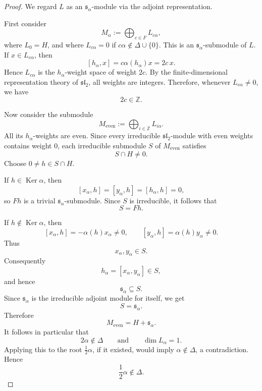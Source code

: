 \begin{proof}
    We regard \(L\) as an \(\mathfrak{s}_\alpha\)-module via the adjoint
    representation.

    First consider
    \[
        M_\alpha
        :=
        \bigoplus_{c\in F} L_{c\alpha},
    \]
    where \(L_0=H\), and where \(L_{c\alpha}=0\) if \(c\alpha\notin\Delta\cup\{0\}\).
    This is an \(\mathfrak{s}_\alpha\)-submodule of \(L\). If
    \(x\in L_{c\alpha}\), then
    \[
        [h_\alpha,x]
        =
        c\alpha(h_\alpha)x
        =
        2c\,x.
    \]
    Hence \(L_{c\alpha}\) is the \(h_\alpha\)-weight space of weight \(2c\).
    By the finite-dimensional representation theory of \(\mathfrak{sl}_2\), all
    weights are integers. Therefore, whenever \(L_{c\alpha}\neq 0\), we have
    \[
        2c\in\mathbb{Z}.
    \]

    Now consider the submodule
    \[
        M_{\mathrm{even}}
        :=
        \bigoplus_{i\in\mathbb{Z}} L_{i\alpha}.
    \]
    All its \(h_\alpha\)-weights are even. Since every irreducible
    \(\mathfrak{sl}_2\)-module with even weights contains weight \(0\), each
    irreducible submodule \(S\) of \(M_{\mathrm{even}}\) satisfies
    \[
        S\cap H\neq 0.
    \]
    Choose \(0\neq h\in S\cap H\).

    If \(h\in\operatorname{Ker}\alpha\), then
    \[
        [x_\alpha,h]=[y_\alpha,h]=[h_\alpha,h]=0,
    \]
    so \(Fh\) is a trivial \(\mathfrak{s}_\alpha\)-submodule. Since \(S\) is
    irreducible, it follows that
    \[
        S=Fh.
    \]

    If \(h\notin\operatorname{Ker}\alpha\), then
    \[
        [x_\alpha,h]
        =
        -\alpha(h)x_\alpha\neq 0,
        \qquad
        [y_\alpha,h]
        =
        \alpha(h)y_\alpha\neq 0.
    \]
    Thus
    \[
        x_\alpha,y_\alpha\in S.
    \]
    Consequently
    \[
        h_\alpha=[x_\alpha,y_\alpha]\in S,
    \]
    and hence
    \[
        \mathfrak{s}_\alpha\subseteq S.
    \]
    Since \(\mathfrak{s}_\alpha\) is the irreducible adjoint module for itself,
    we get
    \[
        S=\mathfrak{s}_\alpha.
    \]
    Therefore
    \[
        M_{\mathrm{even}}
        =
        H+\mathfrak{s}_\alpha.
    \]
    It follows in particular that
    \[
        2\alpha\notin\Delta
        \qquad\text{and}\qquad
        \dim L_\alpha=1.
    \]
    Applying this to the root \(\frac{1}{2}\alpha\), if it existed, would imply
    \(\alpha\notin\Delta\), a contradiction. Hence
    \[
        \frac{1}{2}\alpha\notin\Delta.
    \]


\end{proof}
